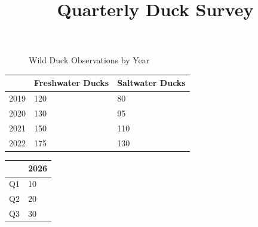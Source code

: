 \documentclass[11pt,a4paper]{article}
\title{Quarterly Duck Survey}
\begin{document}
\maketitle

\begin{figure}[h]
\caption{Wild Duck Observations by Year}
\end{figure}

\begin{table}[h]
\begin{tabular}{|l|l|l|}
\hline
 & Freshwater Ducks & Saltwater Ducks \\ \hline
2019 & 120 & 80 \\ \hline
2020 & 130 & 95 \\ \hline
2021 & 150 & 110 \\ \hline
2022 & 175 & 130 \\ \hline
\end{tabular}
\end{table}

\begin{figure}[h]
\end{figure}

\begin{table}[h]
\begin{tabular}{|l|l|}
\hline
 & 2026 \\ \hline
Q1 & 10 \\ \hline
Q2 & 20 \\ \hline
Q3 & 30 \\ \hline
\end{tabular}
\end{table}
\end{document}
